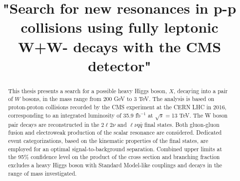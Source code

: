 \documentclass[PhD,binding=0.6cm]{../sapthesis}
\title{"Search for new resonances in p-p collisions using fully leptonic W+W- decays with the CMS detector" }
\begin{document}
\newcommand{\aMC}{\textsc{MadGraph}\xspace}
\newcommand{\qqbar}{$q \bar{q}$}
\newcommand{\POWHEG} {{\textsc{powheg}}\xspace}

\frontmatter

\maketitle

\dedication{ \textsc{Memento Avdere Semper \\}   \vspace*{2mm} -G. D'Annunzio}



\begin{abstract}
This thesis presents a search for a possible heavy Higgs boson, $X$, decaying into a pair of $W$
bosons, in the mass range from 200 GeV to 3 TeV. The analysis is based on proton-proton 
collisions recorded by the CMS experiment at the CERN LHC in 2016, corresponding to an integrated luminosity of 
35.9 fb$^{-1}$  at $\sqrt{s}=$13 TeV. The W boson pair decays are reconstructed in the $2\ell 2\nu$  and $\ell\nu q \bar{q}$ final states. 
Both gluon-gluon fusion and electroweak production of the scalar resonance are considered. 
Dedicated event categorizations, based on the kinematic properties of the final states, are employed for an
optimal signal-to-background separation. 
Combined upper limits at the 95\% confidence level on the product of the cross section and branching fraction excludes a heavy Higgs boson  with Standard Model-like couplings and decays in the range of mass investigated. 
\end{abstract}


\tableofcontents

\end{document}
